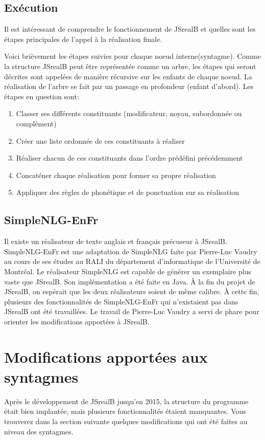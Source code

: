\documentclass[11pt]{article} %
\begin{document}
\subsection{Exécution}

Il est intéressant de comprendre le fonctionnement de JSrealB et quelles
sont les étapes principales de l'appel à la réalisation finale.

Voici brièvement les étapes suivies pour chaque noeud interne(syntagme).
Comme la structure JSrealB peut être représentée comme un arbre, les
étapes qui seront décrites sont appelées de manière récursive sur les
enfants de chaque noeud. La réalisation de l'arbre se fait par un
passage en profondeur (enfant d'abord). Les étapes en question sont:
\begin{enumerate}
\item Classer ses différents constituants (modificateur, noyau, subordonnée
ou complément)
\item Créer une liste ordonnée de ces constituants à réaliser
\item Réaliser chacun de ces constituants dans l'ordre prédéfini précédemment
\item Concaténer chaque réalisation pour former sa propre réalisation
\item Appliquer des règles de phonétique et de ponctuation sur sa réalisation
\end{enumerate}

\subsection{SimpleNLG-EnFr}

Il existe un réalisateur de texte anglais et français précuseur à
JSrealB. SimpleNLG-EnFr est une adaptation de SimpleNLG faite par Pierre-Luc
Vaudry au cours de ses études au RALI du département d'informatique
de l'Université de Montréal. Le réalisateur SimpleNLG est capable
de générer un exemplaire plus vaste que JSrealB. Son implémentation
a été faite en Java. À la fin du projet de JSrealB, on espérait que
les deux réalisateurs soient de même calibre. À cette fin, plusieurs
des fonctionnalités de SimpleNLG-EnFr qui n'existaient pas dans JSrealB
ont été travaillées. Le travail de Pierre-Luc Vaudry a servi de phare
pour orienter les modifications apportées à JSrealB.

\section{Modifications apportées aux syntagmes}
Après le développement de JSrealB jusqu'en 2015, la structure du programme
était bien implantée, mais plusieurs fonctionnalités étaient manquantes.
Vous trouverez dans la section suivante quelques modifications qui
ont été faites au niveau des syntagmes.
\end{document}
